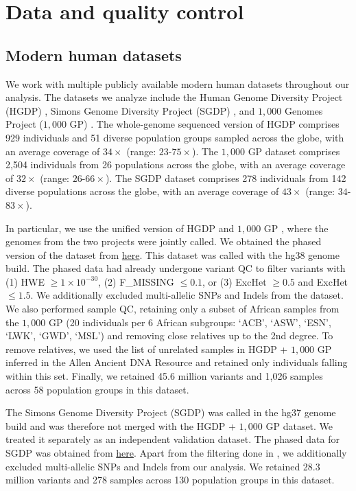 \section{Data and quality control}
\label{sec:ch2-gb-data}
\subsection{Modern human datasets}

We work with multiple publicly available modern human datasets throughout our analysis. The datasets we analyze include the Human Genome Diversity Project (HGDP) \cite{cann2002human, bergstrom2020insights}, Simons Genome Diversity Project (SGDP) \cite{mallick2016simons}, and $1{,}000$ Genomes Project ($1{,}000$ GP) \cite{sudmant2015integrated, 10002015global}.
%
The whole-genome sequenced version of HGDP \cite{bergstrom2020insights} comprises 929 individuals and 51 diverse population groups sampled across the globe, with an average coverage of $34 \times$ (range: $23$-$75 \times$).
%
The $1{,}000$ GP dataset comprises 2,504 individuals from 26 populations across the globe, with an average coverage of $32 \times$ (range: $26$-$66 \times$).
%
The SGDP dataset comprises 278 individuals from 142 diverse populations across the globe, with an average coverage of $43 \times$ (range: $34$-$83 \times$).

In particular, we use the unified version of HGDP and $1{,}000$ GP \cite{koenig2024harmonized}, where the genomes from the two projects were jointly called.
%
We obtained the phased version of the dataset from \href{gs://gcp-public-data‐‐gnomad/resources/hgdp_1kg/phased_haplotypes_v2/}{here}. This dataset was called with the hg38 genome build.
%
The phased data had already undergone variant QC to filter variants with (1) HWE $\geq 1 \times 10^{-30}$, (2) F\_MISSING $\leq 0.1$, or (3) ExcHet $\geq 0.5$ and ExcHet $\leq 1.5$.
%
We additionally excluded multi-allelic SNPs and Indels from the dataset.
%
We also performed sample QC, retaining only a subset of African samples from the $1{,}000$ GP (20 individuals per 6 African subgroups: `ACB', `ASW', `ESN', `LWK', `GWD', `MSL') and removing close relatives up to the 2nd degree.
%
To remove relatives, we used the list of unrelated samples in HGDP + $1{,}000$ GP inferred in the Allen Ancient DNA Resource \cite{mallick2024allen} and retained only individuals falling within this set.
%
Finally, we retained 45.6 million variants and 1,026 samples across 58 population groups in this dataset.

The Simons Genome Diversity Project (SGDP) was called in the hg37 genome build and was therefore not merged with the HGDP + $1{,}000$ GP dataset.
%
We treated it separately as an independent validation dataset.
%
The phased data for SGDP was obtained from \href{https://sharehost.hms.harvard.edu/genetics/reich_lab/sgdp/phased_data.knownbugs.not_recommended.please_use_newer_dataset_instead/}{here}.
%
Apart from the filtering done in \cite{mallick2016simons}, we additionally excluded multi-allelic SNPs and Indels from our analysis.
%
We retained 28.3 million variants and 278 samples across 130 population groups in this dataset.

